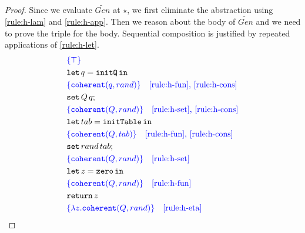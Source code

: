 \begin{proof}
Since we evaluate $\widetilde{Gen}$ at $\star$, we first eliminate the abstraction using \ref{rule:h-lam} and \ref{rule:h-app}. Then we reason about the body of $\widetilde{Gen}$ and we need to prove the triple for the body. Sequential composition is justified by repeated applications of \ref{rule:h-let}.
\small{
\begin{align*}
\begin{aligned}
    &\color{blue} \{\top\} \\
    &\mathtt{let}\,q = \mathtt{initQ}\,\mathtt{in}\, \\
    &\color{blue} \{ \mathtt{coherent}(q, rand) \} \quad \text{\ref{rule:h-fun}, \ref{rule:h-cons}} \\
    &\mathtt{set}\, Q\, q; \\
    &\color{blue} \{ \mathtt{coherent}(Q, rand) \} \quad \text{\ref{rule:h-set}, \ref{rule:h-cons}} \\
    &\mathtt{let}\,tab = \mathtt{initTable}\,\mathtt{in}\, \\
    &\color{blue} \{ \mathtt{coherent}(Q, tab)\} \quad \text{\ref{rule:h-fun}, \ref{rule:h-cons}} \\
    &\mathtt{set}\, rand\, tab; \\
    &\color{blue} \{ \mathtt{coherent}(Q, rand) \} \quad \text{\ref{rule:h-set}} \\
    &\mathtt{let}\,z = \mathtt{zero}\,\mathtt{in}\, \\
    &\color{blue} \{ \mathtt{coherent}(Q, rand) \} \quad \text{\ref{rule:h-fun}} \\
    &\mathtt{return}\, z \\
    &\color{blue} \{ \lambda z. \mathtt{coherent}(Q, rand) \} \quad \text{\ref{rule:h-eta}}
\end{aligned}
\end{align*}
}
\end{proof}

